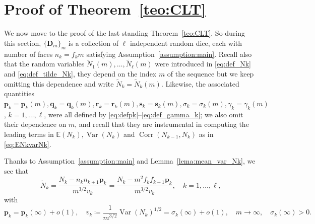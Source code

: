 \documentclass[reqno,a4paper,11pt]{amsart}
\theoremstyle{remark}
\newcommand{\mb}[1]{{\mathbf #1}}
\newcommand{\bb}[1]{{\mathbb #1}}
\numberwithin{equation}{section}
\newcommand{\var}[1]{\operatorname{Var}\left(#1\right)}
\newcommand{\corr}[1]{\operatorname{Corr}\left(#1\right)}
\begin{document}
\section{Proof of Theorem~\ref{teo:CLT}}\label{sec:proof_CLT}

We now move to the proof of the last standing Theorem~\ref{teo:CLT}. So during this section, $\{\mb D_m\}_m$ is a collection of $\ell$ independent random dice, each with number of faces $n_k=f_km$ satisfying Assumption~\ref{assumption:main}. Recall also that the random variables $\widetilde N_1(m),\hdots, \widetilde N_\ell(m)$ were introduced in \eqref{eq:def_Nk} and \eqref{eq:def_tilde_Nk}, they depend on the index $m$ of the sequence but we keep omitting this dependence and write $\widetilde N_k=\widetilde N_k(m)$. Likewise, the associated quantities $\mb p_k=\mb p_k(m), \mb q_k=\mb q_k(m), \mb r_k=\mb r_k(m), \mb s_k=\mb s_k(m),\sigma_k=\sigma_k(m), \gamma_k=\gamma_k(m)$, $k=1,\hdots, \ell$, were all defined by \eqref{eq:defpk}--\eqref{eq:def_gamma_k}; we also omit their dependence on $m$, and recall that they are instrumental in computing the leading terms in $\bb E(N_k), \var{N_k}$ and $\corr{N_{k-1},N_k}$ as in \eqref{eq:ENkvarNk}.

Thanks to Assumption~\ref{assumption:main} and Lemma~\ref{lema:mean_var_Nk}, we see that
%
\begin{equation}\label{eq:standarlization}
\widetilde N_k=\frac{N_k-n_kn_{k+1}\mb p_k}{m^{3/2}v_k}=\frac{N_k-m^2f_kf_{k+1}\mb p_k}{m^{3/2}v_k},\quad k=1,\hdots, \ell,
\end{equation}
%
with 
%
$$
\mb p_k=\mb p_k(\infty)+o(1),\quad v_k\coloneqq \frac{1}{m^{3/2}}\var{N_k}^{1/2}=\sigma_k(\infty)+o(1),\quad m\to \infty,\quad \sigma_k(\infty)>0.
$$
%
\end{document}
